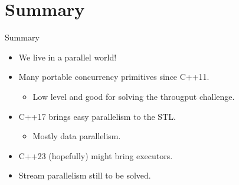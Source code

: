 \section{Summary}

\begin{frame}[t]{Summary}
\begin{itemize}
\item We live in a parallel world!
\vfill\pause
\item Many portable concurrency primitives since C++11.
  \begin{itemize}
    \item Low level and good for solving the througput challenge.
  \end{itemize}
\vfill\pause
\item C++17 brings easy parallelism to the STL.
  \begin{itemize}
    \item Mostly data parallelism.
   \end{itemize}
\vfill\pause
\item C++23 (hopefully) might bring executors.
\vfill\pause
\item Stream parallelism still to be solved.
\end{itemize}
\end{frame}
